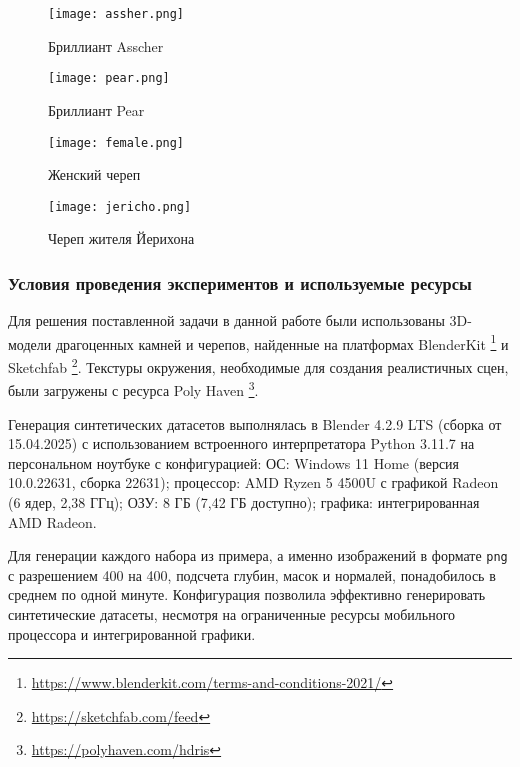 \begin{figure}[t]
\begin{minipage}{0.5\linewidth}
	\centering
	\texttt{[image: assher.png]}
	\caption{Бриллиант Asscher}
\end{minipage}%
\begin{minipage}{0.5\linewidth}
	\centering
	\texttt{[image: pear.png]}
	\caption{Бриллиант Pear}
\end{minipage}

\vspace{0.4cm}

\begin{minipage}{0.5\linewidth}
	\centering
	\texttt{[image: female.png]}
	\caption{Женский череп}
\end{minipage}%
\begin{minipage}{0.5\linewidth}
	\centering
	\texttt{[image: jericho.png]}
	\caption{Череп жителя Йерихона}
\end{minipage}
\end{figure}

\subsubsection*{Условия проведения экспериментов и используемые ресурсы}

Для решения поставленной задачи в данной работе были использованы 3D-модели
драгоценных камней и черепов, найденные на платформах BlenderKit
\footnote{\url{https://www.blenderkit.com/terms-and-conditions-2021/}} и Sketchfab
\footnote{\url{https://sketchfab.com/feed}}. Текстуры окружения, необходимые для создания
реалистичных сцен, были загружены с ресурса Poly Haven
\footnote{\url{https://polyhaven.com/hdris}}.

Генерация синтетических датасетов выполнялась в Blender 4.2.9 LTS (сборка от
15.04.2025) с использованием встроенного интерпретатора Python 3.11.7 на
персональном ноутбуке с конфигурацией: ОС: Windows 11 Home (версия 10.0.22631,
сборка 22631); процессор: AMD Ryzen 5 4500U с графикой Radeon (6 ядер, 2,38
ГГц); ОЗУ: 8 ГБ (7,42 ГБ доступно); графика: интегрированная AMD Radeon.

Для генерации каждого набора из примера, а именно изображений в формате
\texttt{png} с разрешением 400 на 400, подсчета глубин, масок и нормалей,
понадобилось в среднем по одной минуте. Конфигурация позволила эффективно
генерировать синтетические датасеты, несмотря на ограниченные ресурсы мобильного
процессора и интегрированной графики.

